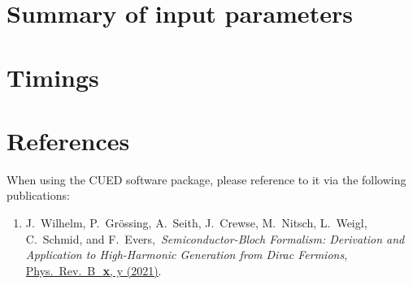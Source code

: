 \documentclass[11pt, a4paper]{scrartcl}
\newcommand{\paper}[4]{\item #1, \,\textit{#2}, \,\href{#3}{#4}.\\[-1.4em]}
\begin{document}
\section{Summary of input parameters}

\section{Timings}


\section{References}
When using the CUED software package, please reference to it via the following publications:
\begin{enumerate}[leftmargin=*]

\paper{J.~Wilhelm, P.~Grössing, A.~Seith, J.~Crewse, M.~Nitsch, L.~Weigl, C.~Schmid, and F.~Evers}{Semi\-con\-duc\-tor-Bloch Formalism: Derivation and Application to High-Harmonic Generation from Dirac Fermions}{TOBEFILLED}{ 
Phys.~Rev.~B~\,\textbf{x}, y (2021)}
\label{Wilhelm2021}

\end{enumerate}
\end{document}
